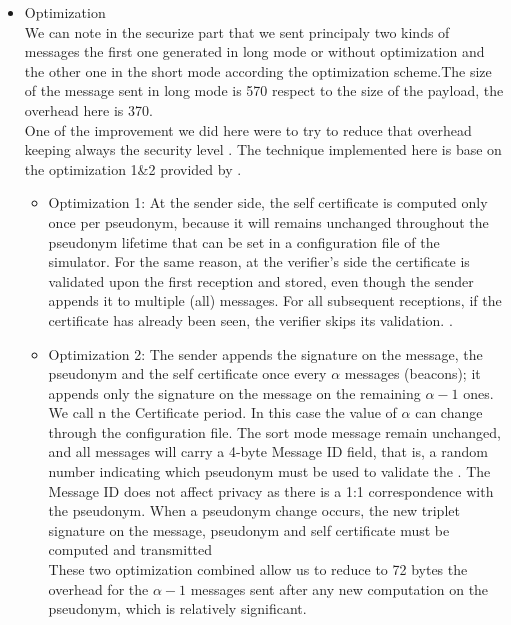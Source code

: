 \begin{itemize}
\item Optimization\\

We can note in the securize part  that we sent principaly two kinds of messages the first one generated in long mode or without optimization and the other one in the short mode according the optimization scheme.The size of the message sent in long mode is 570 respect to the size of the payload, the overhead here is 370.\\
 One of the improvement we did here were to try to reduce that overhead keeping always the security level . The technique implemented  here is base on the  optimization 1\&2 provided by \cite{calandriello}. \\
 \begin{itemize}
 \item Optimization 1: At the sender side, the self certificate  is computed only once per pseudonym, because it will remains unchanged throughout the pseudonym lifetime that can be set in a configuration file of the simulator. For the same reason, at the verifier's side the certificate is validated upon the first reception and stored, even though the sender appends it to multiple (all) messages. For all subsequent receptions, if the certificate has already been seen, the verifier skips its validation.
 .\\
 \item Optimization 2: The sender appends  the signature on the message, the pseudonym and the self certificate once  every $\alpha$ messages (beacons); it appends only the signature on the message  on the remaining $\alpha-1$ ones. We call n the Certificate period. In this case the value of $\alpha$ can change through the configuration file. The sort mode message remain  unchanged, and all messages will carry a 4-byte Message ID field, that is, a random number indicating which pseudonym must be used to validate the . The Message ID does not affect privacy as there is a 1:1 correspondence with the pseudonym. When a pseudonym change occurs, the new triplet signature on the message, pseudonym and self certificate  must be computed and transmitted\\
  These two optimization combined allow us to reduce to 72 bytes the overhead for the $\alpha-1$ messages sent after any new computation on the pseudonym, which is relatively significant.
\end{itemize}
\end{itemize}


